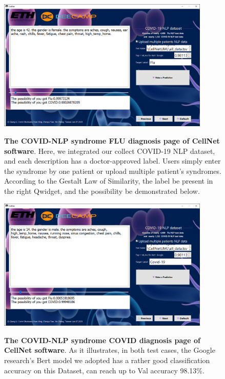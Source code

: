\begin{figure}[t]
\begin{center}
\includegraphics[height=0.3\textheight,width=0.9\textwidth]{thesis-template-master/images/cellnet7-2page.PNG}
\label{fig:cellnet}
\end{center}
\caption{ \textbf{The COVID-NLP syndrome FLU diagnosis page of CellNet software}. Here, we integrated our collect COVID-19 NLP dataset, and each description has a doctor-approved label. Users simply enter the syndrome by one patient or upload multiple patient's syndromes. According to the Gestalt Law of Similarity, the label be present in the right Qwidget, and the possibility be demonstrated below.}
\label{fig:6.17}
\end{figure}


\begin{figure}[t]
\begin{center}
\includegraphics[height=0.3\textheight,width=0.9\textwidth]{thesis-template-master/images/cellnet7-3page.PNG}
\label{fig:cellnet}
\end{center}
\caption{\textbf{The COVID-NLP syndrome COVID diagnosis page of CellNet software}. As it illustrates, in both test cases, the Google research's Bert model\cite{bert} we adopted has a rather good classification accuracy on this Dataset, can reach up to Val accuracy 98.13\%. }
\label{fig:6.18}
\end{figure}

